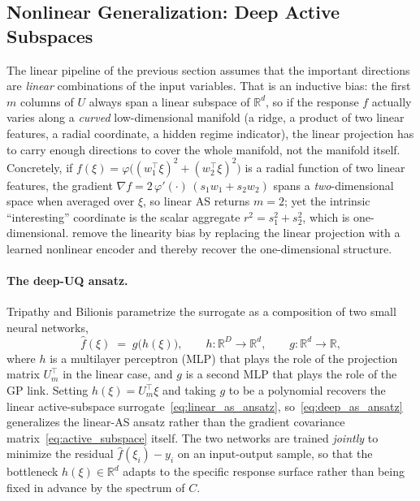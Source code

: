 \documentclass[11pt,a4paper]{report}
\newcommand{\R}{\mathbb{R}}
\begin{document}
\subsection{Nonlinear Generalization: Deep Active Subspaces}
\label{sec:deep_as}

The linear pipeline of the previous section assumes that the important directions are \emph{linear} combinations of the input variables.  That is an inductive bias: the first $m$ columns of $U$ always span a linear subspace of $\R^d$, so if the response $f$ actually varies along a \emph{curved} low-dimensional manifold (a ridge, a product of two linear features, a radial coordinate, a hidden regime indicator), the linear projection has to carry enough directions to cover the whole manifold, not the manifold itself.  Concretely, if $f(\xi) = \varphi\!\bigl((w_1^\top \xi)^2 + (w_2^\top \xi)^2\bigr)$ is a radial function of two linear features, the gradient $\nabla f = 2\,\varphi'(\cdot)\,(s_1 w_1 + s_2 w_2)$ spans a \emph{two}-dimensional space when averaged over $\xi$, so linear AS returns $m = 2$; yet the intrinsic ``interesting'' coordinate is the scalar aggregate $r^2 = s_1^2 + s_2^2$, which is one-dimensional.  \citet{tripathy2018deep} remove the linearity bias by replacing the linear projection with a learned nonlinear encoder and thereby recover the one-dimensional structure.

\paragraph{The deep-UQ ansatz.}
Tripathy and Bilionis parametrize the surrogate as a composition of two small neural networks,
\begin{equation}
\hat f(\xi) \;=\; g\bigl(h(\xi)\bigr),
\qquad
h\colon \R^D \!\to\! \R^d,
\qquad
g\colon \R^d \!\to\! \R,
\label{eq:deep_as_ansatz}
\end{equation}
where $h$ is a multilayer perceptron (MLP) that plays the role of the projection matrix $U_m^\top$ in the linear case, and $g$ is a second MLP that plays the role of the GP link.  Setting $h(\xi) = U_m^\top \xi$ and taking $g$ to be a polynomial recovers the linear active-subspace surrogate~\eqref{eq:linear_as_ansatz}, so~\eqref{eq:deep_as_ansatz} generalizes the linear-AS ansatz rather than the gradient covariance matrix~\eqref{eq:active_subspace} itself.  The two networks are trained \emph{jointly} to minimize the residual $\hat f(\xi_i) - y_i$ on an input-output sample, so that the bottleneck $h(\xi) \in \R^d$ adapts to the specific response surface rather than being fixed in advance by the spectrum of $C$.
\end{document}
